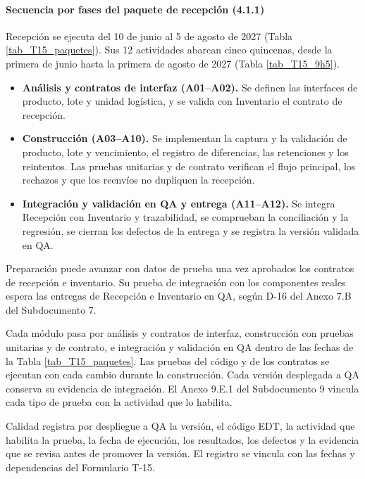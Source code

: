 
\paragraph{Secuencia por fases del paquete de recepción (4.1.1)}
Recepción se ejecuta del 10 de junio al 5 de agosto de 2027 (Tabla \ref{tab_T15_paquetes}). Sus 12 actividades abarcan cinco quincenas, desde la primera de junio hasta la primera de agosto de 2027 (Tabla \ref{tab_T15_9h5}).

\begin{itemize}
\item \textbf{Análisis y contratos de interfaz (A01–A02).} Se definen las interfaces de producto, lote y unidad logística, y se valida con Inventario el contrato de recepción.
\item \textbf{Construcción (A03–A10).} Se implementan la captura y la validación de producto, lote y vencimiento, el registro de diferencias, las retenciones y los reintentos. Las pruebas unitarias y de contrato verifican el flujo principal, los rechazos y que los reenvíos no dupliquen la recepción.
\item \textbf{Integración y validación en QA y entrega (A11–A12).} Se integra Recepción con Inventario y trazabilidad, se comprueban la conciliación y la regresión, se cierran los defectos de la entrega y se registra la versión validada en QA.
\end{itemize}

Preparación puede avanzar con datos de prueba una vez aprobados los contratos de recepción e inventario. Su prueba de integración con los componentes reales espera las entregas de Recepción e Inventario en QA, según D-16 del Anexo 7.B del Subdocumento 7.

Cada módulo pasa por análisis y contratos de interfaz, construcción con pruebas unitarias y de contrato, e integración y validación en QA dentro de las fechas de la Tabla \ref{tab_T15_paquetes}. Las pruebas del código y de los contratos se ejecutan con cada cambio durante la construcción. Cada versión desplegada a QA conserva su evidencia de integración. El Anexo 9.E.1 del Subdocumento 9 vincula cada tipo de prueba con la actividad que lo habilita.

Calidad registra por despliegue a QA la versión, el código EDT, la actividad que habilita la prueba, la fecha de ejecución, los resultados, los defectos y la evidencia que se revisa antes de promover la versión. El registro se vincula con las fechas y dependencias del Formulario T-15.

